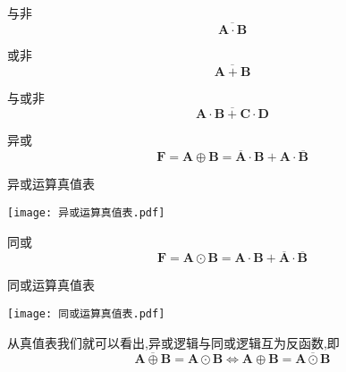     与非
    \begin{equation}
        \overline{\boldsymbol{A}\cdot \boldsymbol{B}}
    \end{equation}

    或非
    \begin{equation}
        \overline{\boldsymbol{A}+\boldsymbol{B}}
    \end{equation}

    与或非
    \begin{equation}
        \overline{\boldsymbol{A}\cdot \boldsymbol{B}+\boldsymbol{C}\cdot \boldsymbol{D}}
    \end{equation}

    异或
    \begin{equation}
        \boldsymbol{F}=\boldsymbol{A}\oplus \boldsymbol{B}=\overline{\boldsymbol{A}}\cdot \boldsymbol{B}+\boldsymbol{A}\cdot \overline{\boldsymbol{B}}
    \end{equation}

    \begin{table}[htbp]
        \centering
        \caption{异或运算真值表} 
        \label{fig:异或运算真值表}
        \texttt{[image: 异或运算真值表.pdf]}
         
    \end{table}

    同或
    \begin{equation}
        \boldsymbol{F}=\boldsymbol{A}\odot \boldsymbol{B}=\boldsymbol{A}\cdot \boldsymbol{B}+\overline{\boldsymbol{A}}\cdot \overline{\boldsymbol{B}}
    \end{equation}

    \begin{table}[htbp]
        \centering
        \caption{同或运算真值表}
        \label{fig:同或运算真值表}
        \texttt{[image: 同或运算真值表.pdf]}
          
    \end{table}

    从真值表我们就可以看出,异或逻辑与同或逻辑互为反函数,即
    \begin{equation}
        \overline{\boldsymbol{A}\oplus \boldsymbol{B}}=\boldsymbol{A}\odot \boldsymbol{B}\Longleftrightarrow \boldsymbol{A}\oplus \boldsymbol{B}=\overline{\boldsymbol{A}\odot \boldsymbol{B}}
    \end{equation}

